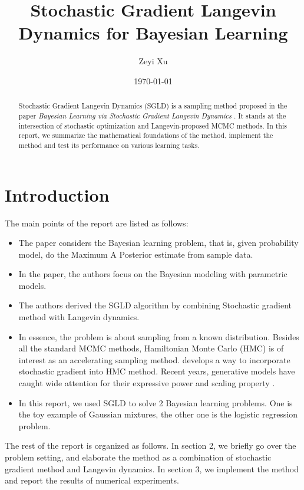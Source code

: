 \documentclass[10pt]{amsart}
\begin{document}
\title{Stochastic Gradient Langevin Dynamics for Bayesian Learning}
\author{Zeyi Xu}\date{\today}
\begin{abstract}
Stochastic Gradient Langevin Dynamics (SGLD) is a sampling method proposed in the paper \textit{Bayesian Learning via Stochastic Gradient Langevin Dynamics} \cite{10.5555/3104482.3104568}. It stands at the intersection of stochastic optimization and Langevin-proposed MCMC methods. In this report, we summarize the mathematical foundations of the method, implement the method and test its performance on various learning tasks.
\end{abstract}
\maketitle

\tableofcontents
\section{Introduction}
The main points of the report are listed as follows:
\begin{itemize}
    \item The paper considers the Bayesian learning problem, that is, given probability model, do the Maximum A Posterior estimate from sample data.
    \item In the paper, the authors focus on the Bayesian modeling with parametric models.
    \item The authors derived the SGLD algorithm by combining Stochastic gradient method with Langevin dynamics.
    \item In essence, the problem is about sampling from a known distribution. Besides all the standard MCMC methods, Hamiltonian Monte Carlo (HMC) is of interest as an accelerating sampling method. \cite{chen2014stochasticgradienthamiltonianmonte} develops a way to incorporate stochastic gradient into HMC method. Recent years, generative models have caught wide attention for their expressive power and scaling property \cite{Bond_Taylor_2022}.
    \item In this report, we used SGLD to solve 2 Bayesian learning problems. One is the toy example of Gaussian mixtures, the other one is the logistic regression problem.
\end{itemize}
The rest of the report is organized as follows. In section 2, we briefly go over the problem setting, and elaborate the method as a combination of stochastic gradient method and Langevin dynamics. In section 3, we implement the method and report the results of numerical experiments.
\end{document}
